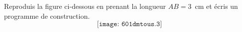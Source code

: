 Reproduis la figure ci-dessous en prenant la longueur $AB=3$~cm
 et écris un programme de construction.
\[\texttt{[image: 601dmtous.3]}\]